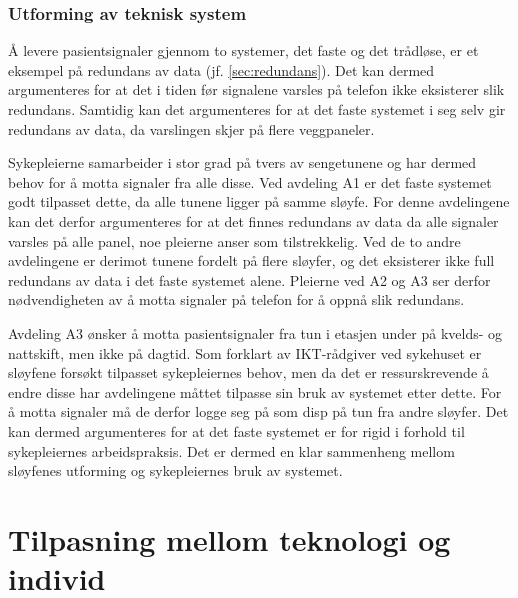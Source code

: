 \subsubsection{Utforming av teknisk system}
Å levere pasientsignaler gjennom to systemer, det faste og det trådløse, er et eksempel på redundans av data (jf. \ref{sec:redundans}). Det kan dermed argumenteres for at det i tiden før signalene varsles på telefon ikke eksisterer slik redundans. Samtidig kan det argumenteres for at det faste systemet i seg selv gir redundans av data, da varslingen skjer på flere veggpaneler. 

\noindent
Sykepleierne samarbeider i stor grad på tvers av sengetunene og har dermed behov for å motta signaler fra alle disse. Ved avdeling A1 er det faste systemet godt tilpasset dette, da alle tunene ligger på samme sløyfe. For denne avdelingene kan det derfor argumenteres for at det finnes redundans av data da alle signaler varsles på alle panel, noe pleierne anser som tilstrekkelig. Ved de to andre avdelingene er derimot tunene fordelt på flere sløyfer, og det eksisterer ikke full redundans av data i det faste systemet alene. Pleierne ved A2 og A3 ser derfor nødvendigheten av å motta signaler på telefon for å oppnå slik redundans. 

\noindent
Avdeling A3 ønsker å motta pasientsignaler fra tun i etasjen under på kvelds- og nattskift, men ikke på dagtid. Som forklart av IKT-rådgiver ved sykehuset er sløyfene forsøkt tilpasset sykepleiernes behov, men da det er ressurskrevende å endre disse har avdelingene måttet tilpasse sin bruk av systemet etter dette. For å motta signaler må de derfor logge seg på som disp på tun fra andre sløyfer. Det kan dermed argumenteres for at det faste systemet er for rigid i forhold til sykepleiernes arbeidspraksis. Det er dermed en klar sammenheng mellom sløyfenes utforming og sykepleiernes bruk av systemet.

\section{Tilpasning mellom teknologi og individ}


